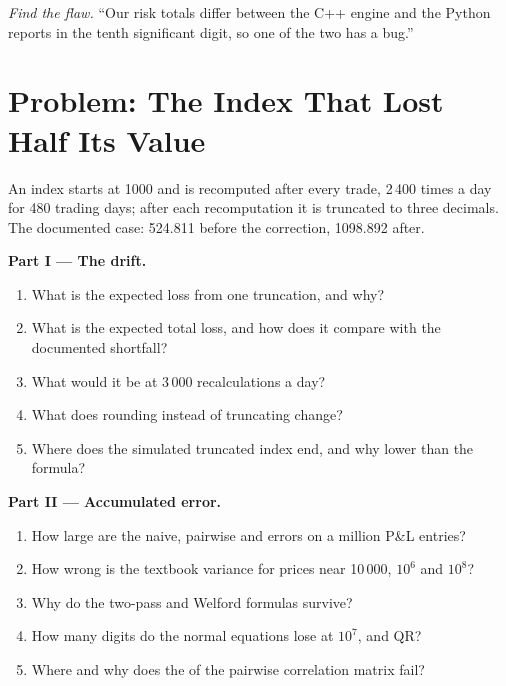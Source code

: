 \begin{exercise}[$\star\star\star$]\label{exo:qm:floating-point-and-numerical-linear-algebra:8}
\emph{Find the flaw.} ``Our risk totals differ between the C++ engine and the Python reports in the tenth significant digit, so one of the two has a bug.''
\end{exercise}

\section{Problem: The Index That Lost Half Its Value}

\begin{problem}\label{pb:qm:floating-point-and-numerical-linear-algebra:1}
An index starts at 1000 and is recomputed after every trade, 2\,400 times a day for 480 trading days; after each recomputation it is truncated to three decimals. The documented case: 524.811 before the
correction, 1098.892 after.

\medskip\noindent\textbf{Part I --- The drift.}
\begin{enumerate}
\item What is the expected loss from one truncation, and why?
\item What is the expected total loss, and how does it compare with the documented shortfall?
\item What would it be at 3\,000 recalculations a day?
\item What does rounding instead of truncating change?
\item Where does the simulated truncated index end, and why lower than the formula?
\end{enumerate}

\medskip\noindent\textbf{Part II --- Accumulated error.}
\begin{enumerate}[resume]
\item How large are the naive, pairwise and  errors on a million P\&L entries?
\item How wrong is the textbook variance for prices near 10\,000, $10^6$ and $10^8$?
\item Why do the two-pass and Welford formulas survive?
\item How many digits do the normal equations lose at  $10^7$, and QR?
\item Where and why does the  of the pairwise correlation matrix fail?
\end{enumerate}


\end{problem}

